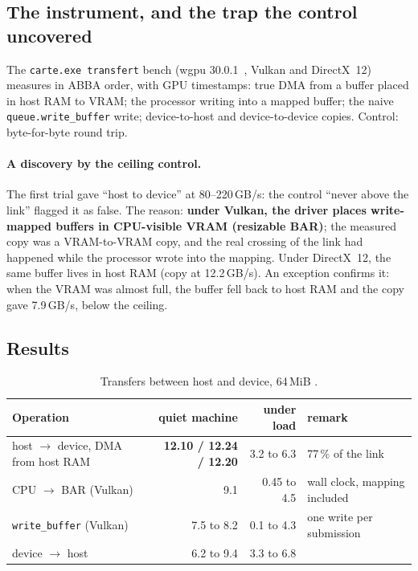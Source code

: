 \subsection{The instrument, and the trap the control uncovered}

The \texttt{carte.exe transfert} bench (wgpu 30.0.1~\cite{gfxrs2026wgpu}, Vulkan and DirectX~12) measures in ABBA order, with GPU timestamps: true DMA from a buffer placed in host RAM to VRAM; the processor writing into a mapped buffer; the naive \texttt{queue.write\_buffer} write; device-to-host and device-to-device copies. Control: byte-for-byte round trip.

\paragraph{A discovery by the ceiling control.} The first trial gave \enquote{host to device} at 80--220\,GB/s: the control \enquote{never above the link} flagged it as false. The reason: \textbf{under Vulkan, the driver places write-mapped buffers in CPU-visible VRAM (resizable BAR)}; the measured copy was a VRAM-to-VRAM copy, and the real crossing of the link had happened while the processor wrote into the mapping. Under DirectX~12, the same buffer lives in host RAM (copy at 12.2\,GB/s). An exception confirms it: when the VRAM was almost full, the buffer fell back to host RAM and the copy gave 7.9\,GB/s, below the ceiling.

\subsection{Results}

\begin{table}[ht]
\centering\small
\caption[Host $\leftrightarrow$ device transfers, 64\,MiB]{Transfers between host and device, 64\,MiB \mes.}
\label{tab:pcie}
\begin{tabular}{@{}lrrl@{}}
\toprule
Operation & quiet machine & under load & remark \\
\midrule
host $\to$ device, DMA from host RAM & \textbf{12.10 / 12.24 / 12.20} & 3.2 to 6.3 & 77\,\% of the link \\
CPU $\to$ BAR (Vulkan) & 9.1 & 0.45 to 4.5 & wall clock, mapping included \\
\texttt{write\_buffer} (Vulkan) & 7.5 to 8.2 & 0.1 to 4.3 & one write per submission \\
device $\to$ host & 6.2 to 9.4 & 3.3 to 6.8 & \\
\bottomrule
\end{tabular}
\end{table}

